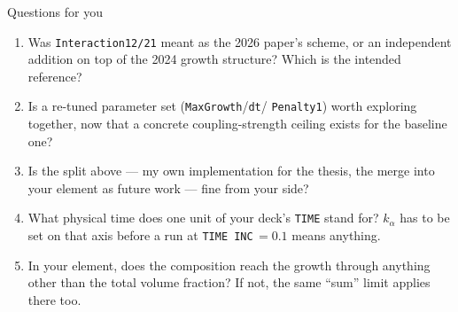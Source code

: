 \documentclass[aspectratio=169,11pt]{beamer}
\begin{document}
\begin{frame}{Questions for you}
\begin{enumerate}
  \item Was \texttt{Interaction12/21} meant as the 2026 paper's scheme, or
        an independent addition on top of the 2024 growth structure? Which
        is the intended reference?
  \item Is a re-tuned parameter set (\texttt{MaxGrowth}/\texttt{dt}/
        \texttt{Penalty1}) worth exploring together, now that a concrete
        coupling-strength ceiling exists for the baseline one?
  \item Is the split above --- my own implementation for the thesis, the
        merge into your element as future work --- fine from your side?
  \item What physical time does one unit of your deck's \texttt{TIME}
        stand for? $k_\alpha$ has to be set on that axis before a run at
        \texttt{TIME INC}$\,=0.1$ means anything.
  \item In your element, does the composition reach the growth through
        anything other than the total volume fraction? If not, the same
        ``sum'' limit applies there too.
\end{enumerate}
\end{frame}
\end{document}
